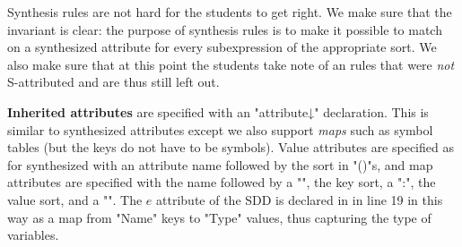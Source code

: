 \documentclass{article}
\begin{document}
  Synthesis rules are not hard for the students to get right.  We make sure that the invariant is
  clear: the purpose of synthesis rules is to make it possible to match on a synthesized attribute
  for every subexpression of the appropriate sort.  We also make sure that at this point the
  students take note of an rules that were \emph{not} S-attributed and are thus still left out.

\smallskip\noindent\textbf{Inherited attributes} are specified with an "attribute↓" declaration. This is similar to
  synthesized attributes except we also support \emph{maps} such as symbol tables (but the keys do
  not have to be symbols). Value attributes are specified as for synthesized with an attribute name
  followed by the sort in "()"s, and map attributes are specified with the name followed by a "{",
    the key sort, a ":", the value sort, and a "}".  The $e$ attribute of the SDD is declared in
  \HAX in line 19 in this way as a map from "Name" keys to "Type" values, thus capturing the type of
  variables.
\end{document}
